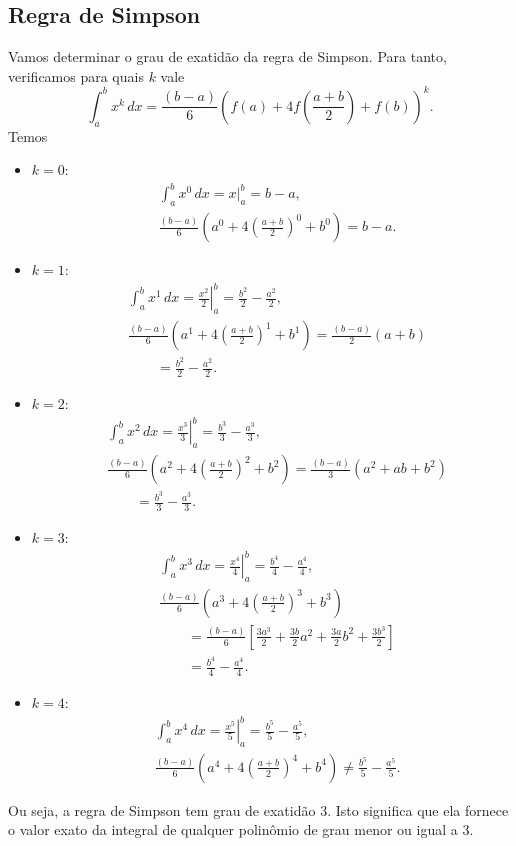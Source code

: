 \subsection{Regra de Simpson}

Vamos determinar o grau de exatidão da regra de Simpson. Para tanto, verificamos para quais $k$ vale
\begin{equation}
  \int_a^b x^k\,dx = \frac{(b-a)}{6}\left(f(a) + 4f\left(\frac{a+b}{2}\right) + f(b)\right)^k.
\end{equation}
Temos
\begin{itemize}
\item $k=0$:
  \begin{align}
    &\int_a^b x^0\,dx = \left. x\right|_a^b = b-a,\\
    &\frac{(b-a)}{6}\left(a^0 + 4\left(\frac{a+b}{2}\right)^0 + b^0\right) = b-a.
  \end{align}
\item $k=1$:
  \begin{align}
    &\int_a^b x^1\,dx = \left. \frac{x^2}{2}\right|_a^b = \frac{b^2}{2}-\frac{a^2}{2},\\
    &\frac{(b-a)}{6}\left(a^1 + 4\left(\frac{a+b}{2}\right)^1 + b^1\right) = \frac{(b-a)}{2}(a+b) \\
    &\qquad = \frac{b^2}{2}-\frac{a^2}{2}.
  \end{align}
\item $k=2$:
  \begin{align}
    &\int_a^b x^2\,dx = \left. \frac{x^3}{3}\right|_a^b = \frac{b^3}{3} - \frac{a^3}{3},\\
    &\frac{(b-a)}{6}\left(a^2 + 4\left(\frac{a+b}{2}\right)^2 + b^2\right) = \frac{(b-a)}{3}(a^2 + ab + b^2)\\
    &\qquad = \frac{b^3}{3} - \frac{a^3}{3}.
  \end{align}
\item $k=3$:
  \begin{align}
    &\int_a^b x^3\,dx = \left. \frac{x^4}{4}\right|_a^b = \frac{b^4}{4}-\frac{a^4}{4},\\
    &\frac{(b-a)}{6}\left(a^3 + 4\left(\frac{a+b}{2}\right)^3 + b^3\right) \\
    &\qquad = \frac{(b-a)}{6}\left[\frac{3 a^{3}}{2} + \frac{3 b}{2} a^{2} + \frac{3 a}{2} b^{2} + \frac{3 b^{3}}{2}\right]\\
    &\qquad = \frac{b^4}{4}-\frac{a^4}{4}.
  \end{align}
\item $k=4$:
  \begin{align}
    &\int_a^b x^4\,dx = \left. \frac{x^5}{5}\right|_a^b = \frac{b^5}{5}-\frac{a^5}{5},\\
    &\frac{(b-a)}{6}\left(a^4 + 4\left(\frac{a+b}{2}\right)^4 + b^4\right) \neq \frac{b^5}{5}-\frac{a^5}{5}.
  \end{align}
\end{itemize}
Ou seja, a regra de Simpson tem grau de exatidão $3$. Isto significa que ela fornece o valor exato da integral de qualquer polinômio de grau menor ou igual a 3.


